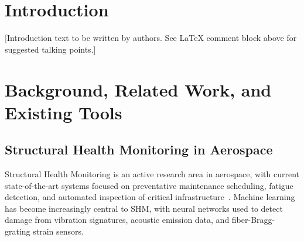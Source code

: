 \documentclass[10pt,letterpaper]{article}
\begin{document}
\section{Introduction}
[Introduction text to be written by authors. See \LaTeX{} comment block above for suggested
talking points.]

\section{Background, Related Work, and Existing Tools}

\subsection{Structural Health Monitoring in Aerospace}

Structural Health Monitoring is an active research area in aerospace, with current
state-of-the-art systems focused on preventative maintenance scheduling, fatigue detection,
and automated inspection of critical infrastructure~\cite{entezami2025}. Machine learning
has become increasingly central to SHM, with neural networks used to detect damage from
vibration signatures, acoustic emission data, and fiber-Bragg-grating strain sensors.
\end{document}

